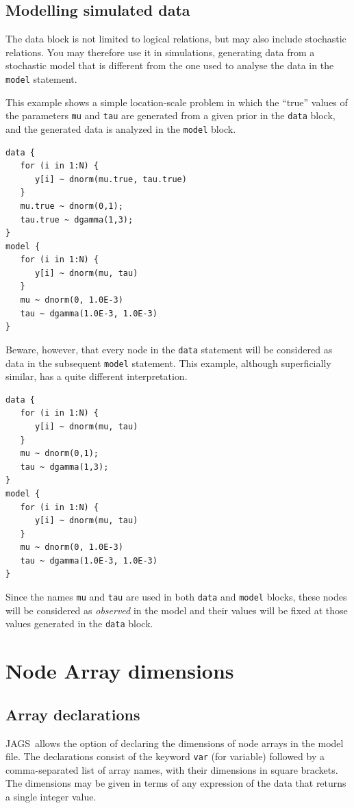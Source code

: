 \documentclass[11pt, a4paper, titlepage]{report}
\newcommand{\JAGS}{\textsf{JAGS}}
\begin{document}
\subsection{Modelling simulated data}

The data block is not limited to logical relations, but may also
include stochastic relations. You may therefore use it in simulations,
generating data from a stochastic model that is different from the one
used to analyse the data in the \texttt{model} statement.

This example shows a simple location-scale problem in which the ``true''
values of the parameters \texttt{mu} and \texttt{tau} are generated
from a given prior in the \texttt{data} block, and the generated
data is analyzed in the \texttt{model} block.
\begin{verbatim}
data {
   for (i in 1:N) {
      y[i] ~ dnorm(mu.true, tau.true) 
   }
   mu.true ~ dnorm(0,1);
   tau.true ~ dgamma(1,3);
}
model {
   for (i in 1:N) {     
      y[i] ~ dnorm(mu, tau)
   }
   mu ~ dnorm(0, 1.0E-3)
   tau ~ dgamma(1.0E-3, 1.0E-3)
}
\end{verbatim}
Beware, however, that every node in the \texttt{data} statement will
be considered as data in the subsequent \texttt{model} statement. This
example, although superficially similar, has a quite different interpretation.
\begin{verbatim}
data {
   for (i in 1:N) {
      y[i] ~ dnorm(mu, tau) 
   }
   mu ~ dnorm(0,1);
   tau ~ dgamma(1,3);
}
model {
   for (i in 1:N) {
      y[i] ~ dnorm(mu, tau)
   }
   mu ~ dnorm(0, 1.0E-3)
   tau ~ dgamma(1.0E-3, 1.0E-3)
}
\end{verbatim}
Since the names \texttt{mu} and \texttt{tau} are used in both
\texttt{data} and \texttt{model} blocks, these nodes will be
considered as {\em observed} in the model and their values will be
fixed at those values generated in the \texttt{data} block.

\section{Node Array dimensions}

\subsection{Array declarations}

\JAGS\ allows the option of declaring the dimensions of node arrays in
the model file. The declarations consist of the keyword \texttt{var}
(for variable) followed by a comma-separated list of array names, with
their dimensions in square brackets. The dimensions may be given in
terms of any expression of the data that returns a single integer
value.
\end{document}
